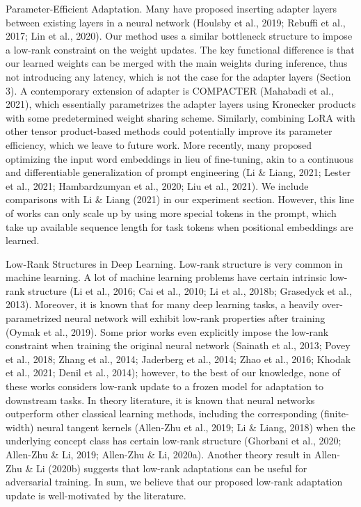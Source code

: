 \documentclass[conference]{IEEEtran}
\begin{document}
Parameter-Efficient Adaptation. Many have proposed inserting adapter layers between existing layers in a neural network (Houlsby et al., 2019; Rebuffi et al., 2017; Lin et al., 2020). Our method uses a similar bottleneck structure to impose a low-rank constraint on the weight updates. The key functional difference is that our learned weights can be merged with the main weights during inference, thus not introducing any latency, which is not the case for the adapter layers (Section 3). A contemporary extension of adapter is COMPACTER (Mahabadi et al., 2021), which essentially parametrizes the adapter layers using Kronecker products with some predetermined weight sharing scheme. Similarly, combining LoRA with other tensor product-based methods could potentially improve its parameter efficiency, which we leave to future work. More recently, many proposed optimizing the input word embeddings in lieu of fine-tuning, akin to a continuous and differentiable generalization of prompt engineering (Li \& Liang, 2021; Lester et al., 2021; Hambardzumyan et al., 2020; Liu et al., 2021). We include comparisons with Li \& Liang (2021) in our experiment section. However, this line of works can only scale up by using more special tokens in the prompt, which take up available sequence length for task tokens when positional embeddings are learned.

Low-Rank Structures in Deep Learning. Low-rank structure is very common in machine learning. A lot of machine learning problems have certain intrinsic low-rank structure (Li et al., 2016; Cai et al., 2010; Li et al., 2018b; Grasedyck et al., 2013). Moreover, it is known that for many deep learning tasks, a heavily over-parametrized neural network will exhibit low-rank properties after training (Oymak et al., 2019). Some prior works even explicitly impose the low-rank constraint when training the original neural network (Sainath et al., 2013; Povey et al., 2018; Zhang et al., 2014; Jaderberg et al., 2014; Zhao et al., 2016; Khodak et al., 2021; Denil et al., 2014); however, to the best of our knowledge, none of these works considers low-rank update to a frozen model for adaptation to downstream tasks. In theory literature, it is known that neural networks outperform other classical learning methods, including the corresponding (finite-width) neural tangent kernels (Allen-Zhu et al., 2019; Li \& Liang, 2018) when the underlying concept class has certain low-rank structure (Ghorbani et al., 2020; Allen-Zhu \& Li, 2019; Allen-Zhu \& Li, 2020a). Another theory result in Allen-Zhu \& Li (2020b) suggests that low-rank adaptations can be useful for adversarial training. In sum, we believe that our proposed low-rank adaptation update is well-motivated by the literature.
\end{document}
